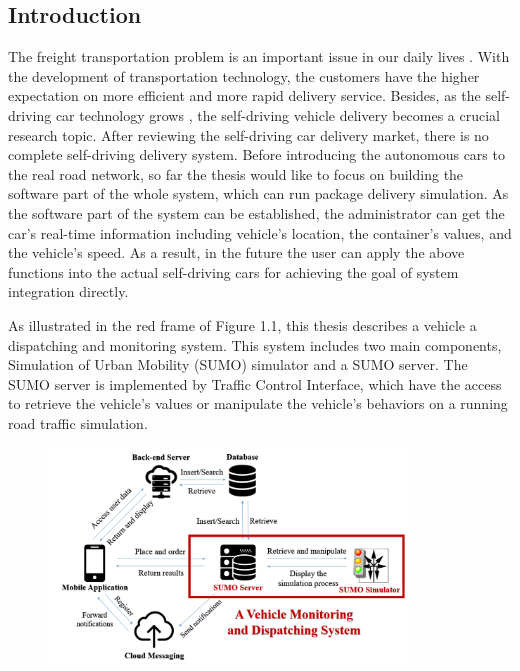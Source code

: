 \documentclass[12pt]{ksthesis}
\begin{document}
\begin{thesis}\large {
\chapter{Introduction} \label{Chap:Introduction}

The freight transportation problem is an important issue in our daily lives \cite{Anand2012}. With the development of transportation technology, the customers have the higher expectation on more efficient and more rapid delivery service. Besides, as the self-driving car technology grows \cite{Lutin2013}, the self-driving vehicle delivery becomes a crucial research topic. After reviewing the self-driving car delivery market, there is no complete self-driving delivery system. 
Before introducing the autonomous cars to the real road network, so far the thesis would like to focus on building the software part of the whole system, which can run package delivery simulation. As the software part of the system can be established, the administrator can get the car’s real-time information including vehicle’s location, the container’s values, and the vehicle’s speed. As a result, in the future the user can apply the above functions into the actual self-driving cars for achieving the goal of system integration directly.

As illustrated in the red frame of Figure 1.1, this thesis describes a vehicle a dispatching and monitoring system. This system includes two main components, Simulation of Urban Mobility (SUMO) simulator and a SUMO server. The SUMO server is implemented by Traffic Control Interface, which have the access to retrieve the vehicle’s values or manipulate the vehicle’s behaviors on a running road traffic simulation.

\begin{figure}[t!]
\centering
\includegraphics[width=0.85\textwidth]{./Thesis_figures/F1-1_System_Design_Overview.PNG}


\end{figure}}
\end{thesis}
\end{document}
